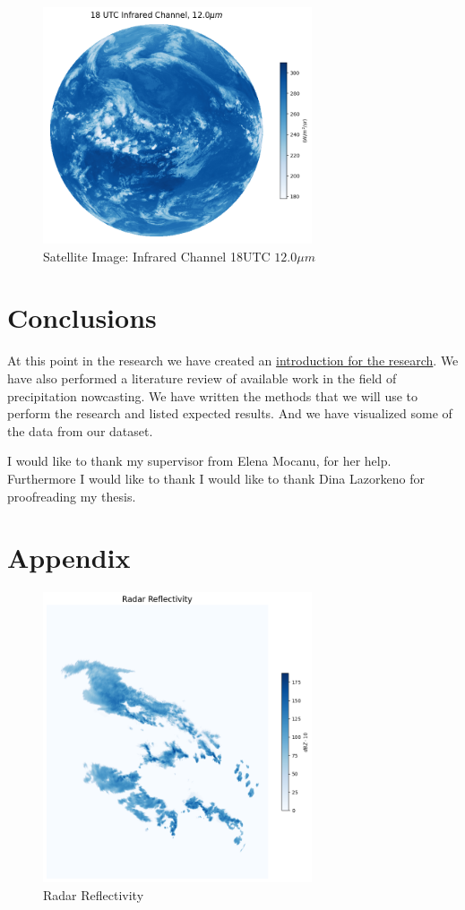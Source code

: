 \documentclass[acmtog, authorversion]{acmart}
\begin{document}
\begin{figure}
    \centering
    \includegraphics[width=225pt]{./images/infrared.png}
    \caption{Satellite Image: Infrared Channel 18UTC $12.0\mu m$}
    \label{fig:infra}
\end{figure}


\section{Conclusions}
At this point in the research we have created an \hyperref[introduction]{introduction for the research}. We have also performed a literature review of available work in the field of precipitation nowcasting. We have written the methods that we will use to perform the research and listed expected results. And we have visualized some of the data from our dataset.

\begin{acks}
I would like to thank my supervisor from Elena Mocanu, for her help. Furthermore I would like to thank I would like to thank Dina Lazorkeno for proofreading my thesis.
\end{acks}




\newpage
\appendix
\section{Appendix}

\begin{figure}
    \centering
    \includegraphics[width=225pt]{./images/radar_reflectivity.png}
    \caption{Radar Reflectivity}
    \Description{}
    \label{fig:reflect}
\end{figure}
\end{document}
